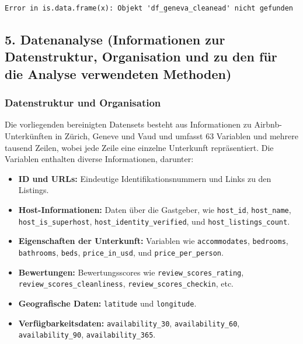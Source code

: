 \documentclass[
  journal,
]{IEEEtran}%
\begin{document}
\begin{verbatim}
Error in is.data.frame(x): Objekt 'df_geneva_cleanead' nicht gefunden
\end{verbatim}

\hypertarget{datenanalyse-informationen-zur-datenstruktur-organisation-und-zu-den-fuxfcr-die-analyse-verwendeten-methoden}{%
\subsection{5. Datenanalyse (Informationen zur Datenstruktur,
Organisation und zu den für die Analyse verwendeten
Methoden)}\label{datenanalyse-informationen-zur-datenstruktur-organisation-und-zu-den-fuxfcr-die-analyse-verwendeten-methoden}}

\hypertarget{datenstruktur-und-organisation}{%
\subsubsection{Datenstruktur und
Organisation}\label{datenstruktur-und-organisation}}

Die vorliegenden bereinigten Datensets besteht aus Informationen zu
Airbnb-Unterkünften in Zürich, Geneve und Vaud und umfasst 63 Variablen
und mehrere tausend Zeilen, wobei jede Zeile eine einzelne Unterkunft
repräsentiert. Die Variablen enthalten diverse Informationen, darunter:

\begin{itemize}
\item
  \textbf{ID und URLs:} Eindeutige Identifikationsnummern und Links zu
  den Listings.
\item
  \textbf{Host-Informationen:} Daten über die Gastgeber, wie
  \texttt{host\_id}, \texttt{host\_name}, \texttt{host\_is\_superhost},
  \texttt{host\_identity\_verified}, und \texttt{host\_listings\_count}.
\item
  \textbf{Eigenschaften der Unterkunft:} Variablen wie
  \texttt{accommodates}, \texttt{bedrooms}, \texttt{bathrooms},
  \texttt{beds}, \texttt{price\_in\_usd}, und
  \texttt{price\_per\_person}.
\item
  \textbf{Bewertungen:} Bewertungsscores wie
  \texttt{review\_scores\_rating}, \texttt{review\_scores\_cleanliness},
  \texttt{review\_scores\_checkin}, etc.
\item
  \textbf{Geografische Daten:} \texttt{latitude} und \texttt{longitude}.
\item
  \textbf{Verfügbarkeitsdaten:} \texttt{availability\_30},
  \texttt{availability\_60}, \texttt{availability\_90},
  \texttt{availability\_365}.
\end{itemize}
\end{document}
